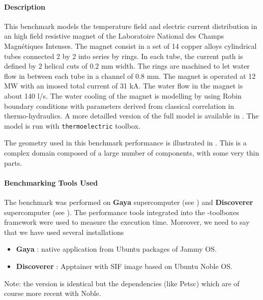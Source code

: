 
\paragraph{Description}

This benchmark models the temperature field and electric current distribution in an high field resistive magnet of the Laboratoire National des Champs Magnétiques Intenses. The magnet consist in a set of 14 copper alloys cylindrical tubes connected 2 by 2 into series by rings. In each tube, the current path is defined by 2 helical cuts of 0.2 mm width. The rings are machined to let water flow in between each tube
in a channel of 0.8 mm. The magnet is operated at 12 MW with an imosed total current of 31 kA. The water flow in the magnet is about 140 l/s. The water cooling of the magnet is modelling by using Robin boundary conditions with parameters derived from classical correlation in thermo-hydraulics.
A more detailled version of the full model is available in \cite{daver2016,Hild2020}. The
model is run with \texttt{thermoelectric} \Feelpp toolbox.

The geometry used in this benchmark performance is illustrated in
. This is a complex domain
composed of a large number of components, with some very thin parts.

\paragraph{Benchmarking Tools Used}
The benchmark was performed on \textbf{Gaya} supercomputer (see ) and \textbf{Discoverer} supercomputer (see
).
The performance tools integrated into the \Feelpp-toolboxes framework were used to measure
the execution time.
Moreover, we need to say that we have used several \Feelpp installations
\begin{itemize}
\item \textbf{Gaya} : native application from Ubuntu packages of Jammy OS.
\item \textbf{Discoverer} : Apptainer with \Feelpp SIF image based on Ubuntu
  Noble OS.
\end{itemize}
Note: the \Feelpp version is identical but the dependencies (like Petsc)
which are of course more recent with Noble.


